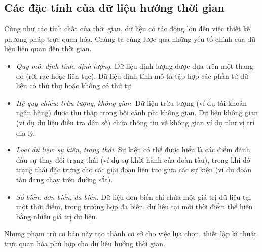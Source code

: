 \subsection{Các đặc tính của dữ liệu hướng thời gian}
Cũng như các tính chất của thời gian, dữ liệu có tác động lớn đến việc thiết kế phương pháp trực quan hóa. Chúng ta cùng lược qua những yếu tố chính của dữ liệu liên quan đến thời gian.
\begin{itemize}
    \item \textit{Quy mô}: \textit{định tính}, \textit{định lượng}. Dữ liệu định lượng được dựa trên một thang đo (rời rạc hoặc liên tục). Dữ liệu định tính mô tả tập hợp các phần tử dữ liệu có thứ thự hoặc không có thứ tự.
    \item \textit{Hệ quy chiếu}: \textit{trừu tượng}, \textit{không gian}. Dữ liệu trừu tượng (ví dụ tài khoản ngân hàng) được thu thập trong bối cảnh phi không gian. Dữ liệu không gian (ví dụ dữ liệu điều tra dân số) chứa thông tin về không gian ví dụ như vị trí địa lý.
    \item \textit{Loại dữ liệu}: \textit{sự kiện}, \textit{trạng thái}. Sự kiện có thể được hiểu là các điểm đánh dấu sự thay đổi trạng thái (ví dụ sự khời hành của đoàn tàu), trong khi đó trạng thái đặc trưng cho các giai đoạn liên tục giữa các sự kiện (ví dụ đoàn tàu đang chạy trên đường sắt).
    \item \textit{Số biến}: \textit{đơn biến}, \textit{đa biến}. Dữ liệu đơn biến chỉ chứa một giá trị dữ liệu tại một thời điểm, trong trường hợp đa biến, dữ liệu tại mỗi thời điểm thể hiện bằng nhiều giá trị dữ liệu.
\end{itemize}
Những phạm trù cơ bản này tạo thành cơ sở cho việc lựa chọn, thiết lập kĩ thuật trực quan hóa phù hợp cho dữ liệu hướng thời gian. 